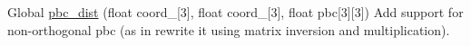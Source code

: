 
\begin{DoxyRefList}
\item[Global \mbox{\hyperlink{chemistry_8h_a943d08970a42acd0c72248fb0c9017f0}{pbc\+\_\+dist}} (float coord\+\_\+1\mbox{[}3\mbox{]}, float coord\+\_\+2\mbox{[}3\mbox{]}, float pbc\mbox{[}3\mbox{]}\mbox{[}3\mbox{]})]\label{todo__todo000001}%
%
Add support for non-\/orthogonal pbc (as in rewrite it using matrix inversion and multiplication). 
\end{DoxyRefList}